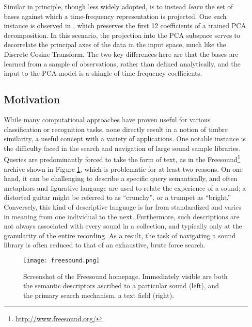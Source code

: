 Similar in principle, though less widely adopted, is to instead \emph{learn} the set of bases against which a time-frequency representation is projected.
One such instance is observed in  \cite{Jehan2005Creating}, which preserves the first 12 coefficients of a trained PCA decomposition.
In this scenario, the projection into the PCA subspace serves to decorrelate the principal axes of the data in the input space, much like the Discrete Cosine Transform.
The two key differences here are that the bases are learned from a sample of observations, rather than defined analytically, and the input to the PCA model is a shingle of time-frequency coefficients.



\subsection{Motivation}

While many computational approaches have proven useful for various classification or recognition tasks, none directly result in a notion of timbre similarity, a useful concept with a variety of applications.
One notable instance is the difficulty faced in the search and navigation of large sound sample libraries.
Queries are predominantly forced to take the form of text, as in the Freesound\footnote{\url{http://www.freesound.org/}} archive shown in Figure \ref{fig:freesound}, which is problematic for at least two reasons.
On one hand, it can be challenging to describe a specific query semantically, and often metaphors and figurative language are used to relate the experience of a sound; a distorted guitar might be referred to as ``crunchy'', or a trumpet as ``bright.''
Conversely, this kind of descriptive language is far from standardized and varies in meaning from one individual to the next.
Furthermore, such descriptions are not always associated with every sound in a collection, and typically only at the granularity of the entire recording.
As a result, the task of navigating a sound library is often reduced to that of an exhaustive, brute force search.

\begin{figure}[t]
\centering
\texttt{[image: freesound.png]}
\caption{Screenshot of the Freesound homepage. Immediately visible are both the semantic descriptors ascribed to a particular sound (left), and the primary search mechanism, a text field (right).}
\label{fig:freesound}
\end{figure}

